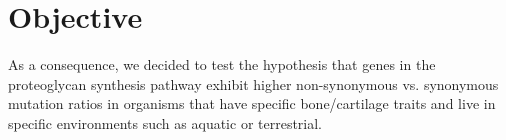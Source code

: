 \documentclass{article}
\begin{document}
\section{Objective}
As a consequence, we decided to test the hypothesis that genes in the proteoglycan synthesis pathway exhibit higher non-synonymous vs. synonymous mutation ratios in organisms that have specific bone/cartilage traits and live in specific environments such as aquatic or terrestrial. 
\end{document}
